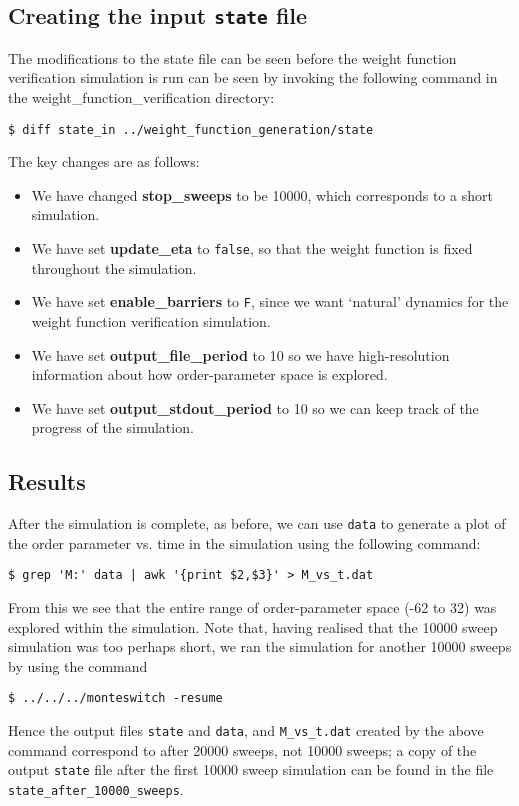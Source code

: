 \documentclass{report}
\begin{document}
\subsection{Creating the input \texttt{state} file}
The modifications to the state file can be seen before the weight function verification simulation is run can be seen by invoking the following command
in the weight\_function\_verification directory:
\begin{verbatim}
$ diff state_in ../weight_function_generation/state
\end{verbatim}
The key changes are as follows:
\begin{itemize}
\item We have changed \textbf{stop\_sweeps} to be 10000, which corresponds to a short simulation.
\item We have set \textbf{update\_eta} to \texttt{false}, so that the weight function is fixed throughout the simulation.
\item We have set \textbf{enable\_barriers} to \texttt{F}, since we want `natural' dynamics for the weight function verification simulation.
\item We have set \textbf{output\_file\_period} to 10 so we have high-resolution information about how order-parameter space is explored.
\item We have set \textbf{output\_stdout\_period} to 10 so we can keep track of the progress of the simulation.
\end{itemize}

\subsection{Results}
After the simulation is complete, as before, we can use \texttt{data} to generate a plot of the order parameter vs. time in the simulation using the
following command:
\begin{verbatim}
$ grep 'M:' data | awk '{print $2,$3}' > M_vs_t.dat
\end{verbatim}
From this we see that the entire range of order-parameter space (-62 to 32) was explored within the simulation. Note that, having realised that the
10000 sweep simulation was too perhaps short, we ran the simulation for another 10000 sweeps by using the command
\begin{verbatim}
$ ../../../monteswitch -resume
\end{verbatim}
Hence the output files \texttt{state} and \texttt{data}, and \texttt{M\_vs\_t.dat} created by the above command correspond to after 20000 sweeps, not 10000 
sweeps; a copy of the 
output \texttt{state} file after the first 10000 sweep simulation can be found in the file \texttt{state\_after\_10000\_sweeps}.
\end{document}
